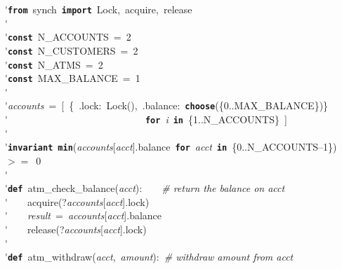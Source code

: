 \'\>\texttt{\textbf{from}}~synch~\texttt{\textbf{import}}~Lock,~acquire,~release\\

\'\>\\

\'\>\texttt{\textbf{const}}~N\_ACCOUNTS~=~2\\

\'\>\texttt{\textbf{const}}~N\_CUSTOMERS~=~2\\

\'\>\texttt{\textbf{const}}~N\_ATMS~=~2\\

\'\>\texttt{\textbf{const}}~MAX\_BALANCE~=~1\\

\'\>\\

\'\>\textit{accounts}~=~[~\{~.lock:~Lock(),~.balance:~\texttt{\textbf{choose}}(\{0..MAX\_BALANCE\})\}\\

\'\>~~~~~~~~~~~~~~~~~~~~~~~~~~~~\texttt{\textbf{for}}~\textit{i}~\texttt{\textbf{in}}~\{1..N\_ACCOUNTS\}~]\\

\'\>\\

\'\>\texttt{\textbf{invariant}}~\texttt{\textbf{min}}(\textit{accounts}[\textit{acct}].balance~\texttt{\textbf{for}}~\textit{acct}~\texttt{\textbf{in}}~\{0..N\_ACCOUNTS--1\})~$>=$~0\\

\'\>\\

\'\>\texttt{\textbf{def}}~atm\_check\_balance(\textit{acct}):~~~~\emph{\# return the balance on acct}\\

\'\>~~~~acquire(?\textit{accounts}[\textit{acct}].lock)\\

\'\>~~~~\textit{result}~=~\textit{accounts}[\textit{acct}].balance\\

\'\>~~~~release(?\textit{accounts}[\textit{acct}].lock)\\

\'\>\\

\'\>\texttt{\textbf{def}}~atm\_withdraw(\textit{acct},~\textit{amount}):~\emph{\# withdraw amount from acct}\\

